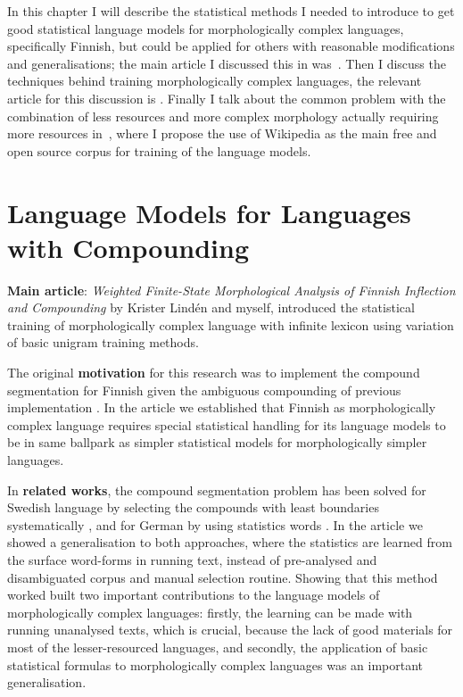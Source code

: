 \documentclass[officiallayout]{unihelcompling}
\begin{document}
In this chapter I will describe the statistical methods I needed to introduce
to get good statistical language models for morphologically complex languages,
specifically Finnish, but could be applied for others with reasonable
modifications and generalisations; the main article I discussed this in
was~. Then I discuss the techniques behind training
morphologically complex languages, the relevant article for this discussion is
. Finally I talk about the common problem with the
combination of less resources and more complex morphology actually requiring
more resources in~, where I propose the use of
Wikipedia as the main free and open source corpus for training of the language
models.

\section{Language Models for Languages with Compounding}

\textbf{Main article}: \emph{Weighted Finite-State Morphological Analysis of
Finnish Inflection and Compounding}  by Krister
Lindén and myself, introduced the statistical training of morphologically
complex language with infinite lexicon using variation of basic unigram
training methods.

The original \textbf{motivation} for this research was to implement the
compound segmentation for Finnish given the ambiguous compounding of previous
implementation \citep{pirinen2008suomen}. In the article we established that
Finnish as morphologically complex language requires special statistical
handling for its language models to be in same ballpark as simpler statistical
models for morphologically simpler languages.

In \textbf{related works}, the compound segmentation problem has been solved
for Swedish language by selecting the compounds with least boundaries
systematically \citep{karlsson1992swetwol}, and for German by using statistics
words \citep{schiller2006german}. In the article we showed a generalisation to
both approaches, where the statistics are learned from the surface word-forms
in running text, instead of pre-analysed and disambiguated corpus and manual
selection routine.  Showing that this method worked built two important
contributions to the language models of morphologically complex languages:
firstly, the learning can be made with running unanalysed texts, which is
crucial, because the lack of good materials for most of the lesser-resourced
languages, and secondly, the application of basic statistical formulas to
morphologically complex languages was an important generalisation.
\end{document}
